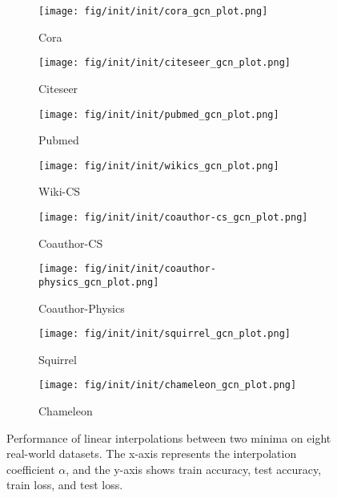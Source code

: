 \begin{figure*}[!ht]\label{fig:mc1}
    \centering
    \begin{subfigure}[b]{0.24\textwidth}
        \centering
        \texttt{[image: fig/init/init/cora\_gcn\_plot.png]}
        \caption{Cora}
    \end{subfigure}
    \begin{subfigure}[b]{0.24\textwidth}
        \centering
        \texttt{[image: fig/init/init/citeseer\_gcn\_plot.png]}
        \caption{Citeseer}
    \end{subfigure}
    \begin{subfigure}[b]{0.24\textwidth}
        \centering
        \texttt{[image: fig/init/init/pubmed\_gcn\_plot.png]}
        \caption{Pubmed}
    \end{subfigure}
    \begin{subfigure}[b]{0.24\textwidth}
        \centering
        \texttt{[image: fig/init/init/wikics\_gcn\_plot.png]}
        \caption{Wiki-CS}
    \end{subfigure}
    \vspace{5pt}
    \label{fig: figure1}
    \newline
    \begin{subfigure}[b]{0.24\textwidth}
        \centering
        \texttt{[image: fig/init/init/coauthor-cs\_gcn\_plot.png]}
        \caption{Coauthor-CS}
    \end{subfigure}
    \begin{subfigure}[b]{0.24\textwidth}
        \centering
        \texttt{[image: fig/init/init/coauthor-physics\_gcn\_plot.png]}
        \caption{Coauthor-Physics}
    \end{subfigure}
    \begin{subfigure}[b]{0.24\textwidth}
        \centering
        \texttt{[image: fig/init/init/squirrel\_gcn\_plot.png]}
        \caption{Squirrel}
    \end{subfigure}
    \begin{subfigure}[b]{0.24\textwidth}
        \centering
        \texttt{[image: fig/init/init/chameleon\_gcn\_plot.png]}
        \caption{Chameleon}
    \end{subfigure}


    \caption{Performance of linear interpolations between two minima on eight real-world datasets. The x-axis represents the interpolation coefficient $\alpha$, and the y-axis shows train accuracy, test accuracy, train loss, and test loss.}
    \vspace{-0.2in}
    \label{fig: figure1}
\end{figure*}
